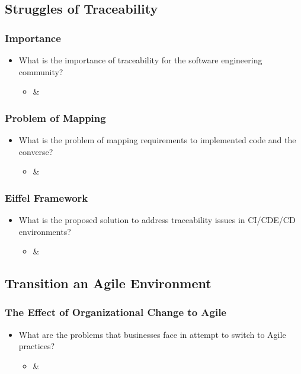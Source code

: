\documentclass[11pt,a4paper]{article}
\begin{document}
	\subsection{Struggles of Traceability}
		\subsubsection{Importance}
		\begin{itemize}[noitemsep]
			\item What is the importance of traceability for the software engineering community?
			\begin{itemize}
				\item \cite{stahl_2017} \& \cite{stahl_hallen_bosch_2016}
			\end{itemize}
		\end{itemize}
		\subsubsection{Problem of Mapping}
		\begin{itemize}[noitemsep]
			\item What is the problem of mapping requirements to implemented code and the converse?
			\begin{itemize}
				\item \cite{stahl_2017} \& \cite{stahl_hallen_bosch_2016}
			\end{itemize}
		\end{itemize}
		\subsubsection{Eiffel Framework}
		\begin{itemize}[noitemsep]
			\item What is the proposed solution to address traceability issues in CI/CDE/CD environments?
			\begin{itemize}
				\item \cite{stahl_2017} \& \cite{stahl_hallen_bosch_2016}
			\end{itemize}
		\end{itemize}
		
	\subsection{Transition an Agile Environment}
		\subsubsection{The Effect of Organizational Change to Agile}
		\begin{itemize}[noitemsep]
			\item What are the problems that businesses face in attempt to switch to Agile practices?
			\begin{itemize}
				\item \cite{bosch_2014} \& \cite{meyer_2014}
			\end{itemize}
		\end{itemize}
\end{document}
